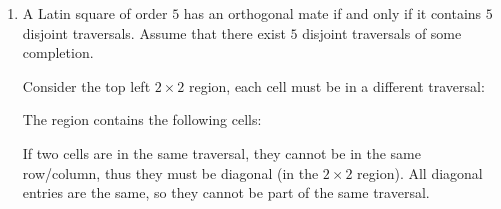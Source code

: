 \documentclass[a4paper, 11pt]{article}
\begin{document}
\begin{enumerate}[label=(\alph*)]
\begin{center}
	\end{center}

		
	
	\item A Latin square of order $5$ has an orthogonal mate if and only if it contains $5$ disjoint traversals. Assume that there exist $5$ disjoint traversals of some completion. 
	
	Consider the top left $2\times 2$ region, each cell must be in a different traversal: 
	\begin{mdframed}
		The region contains the following cells: 
		\begin{center}
		\end{center}

		If two cells are in the same traversal, they cannot be in the same row/column, thus they must be diagonal (in the $2\times 2$ region). All diagonal entries are the same, so they cannot be part of the same traversal. 


\end{mdframed}
\end{enumerate}
\end{document}
